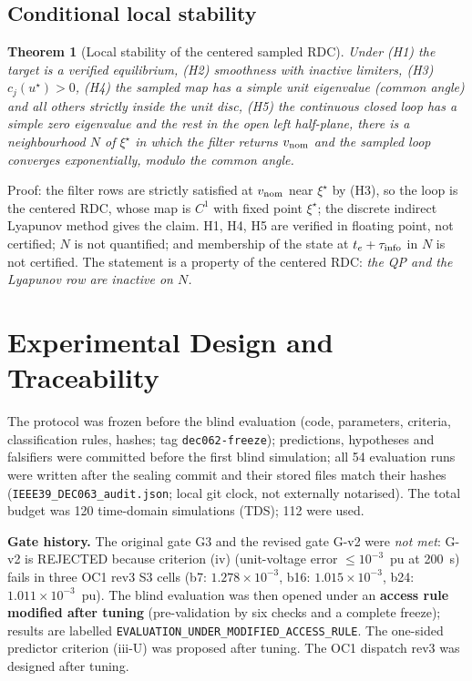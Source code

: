 \documentclass[11pt,twocolumn]{article}
\newtheorem{theorem}{Theorem}
\begin{document}
\subsection{Conditional local stability}
\begin{theorem}[Local stability of the centered sampled RDC]
\label{thm:t2}
Under (H1) the target is a verified equilibrium, (H2) smoothness with inactive limiters, (H3) $c_j(u^\star)>0$, (H4) the sampled map has a simple unit eigenvalue (common angle) and all others strictly inside the unit disc, (H5) the continuous closed loop has a simple zero eigenvalue and the rest in the open left half-plane, there is a neighbourhood $N$ of $\xi^\star$ in which the filter returns $v_{\rm nom}$ and the sampled loop converges exponentially, modulo the common angle.
\end{theorem}
Proof: the filter rows are strictly satisfied at $v_{\rm nom}$ near $\xi^\star$ by (H3), so the loop is the centered RDC, whose map is $C^1$ with fixed point $\xi^\star$; the discrete indirect Lyapunov method gives the claim. H1, H4, H5 are verified in floating point, not certified; $N$ is not quantified; and membership of the state at $t_e+\tau_{\rm info}$ in $N$ is not certified. The statement is a property of the centered RDC: \emph{the QP and the Lyapunov row are inactive on $N$.}

\section{Experimental Design and Traceability}
\label{sec:design}
The protocol was frozen before the blind evaluation (code, parameters, criteria, classification rules, hashes; tag \texttt{dec062-freeze}); predictions, hypotheses and falsifiers were committed before the first blind simulation; all 54 evaluation runs were written after the sealing commit and their stored files match their hashes (\texttt{IEEE39\_DEC063\_audit.json}; local git clock, not externally notarised). The total budget was 120 time-domain simulations (TDS); 112 were used.

\textbf{Gate history.} The original gate G3 and the revised gate G-v2 were \emph{not met}: G-v2 is REJECTED because criterion (iv) (unit-voltage error $\le10^{-3}$~pu at 200~s) fails in three OC1 rev3 S3 cells (b7: $1.278\times10^{-3}$, b16: $1.015\times10^{-3}$, b24: $1.011\times10^{-3}$~pu). The blind evaluation was then opened under an \textbf{access rule modified after tuning} (pre-validation by six checks and a complete freeze); results are labelled \texttt{EVALUATION\_UNDER\_MODIFIED\_ACCESS\_RULE}. The one-sided predictor criterion (iii-U) was proposed after tuning. The OC1 dispatch rev3 was designed after tuning.
\end{document}
